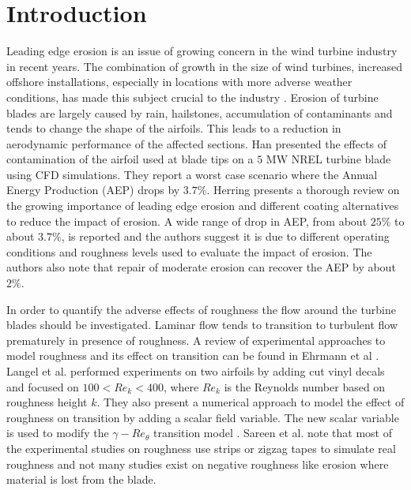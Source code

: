 \section{Introduction}

Leading edge erosion is an issue of growing concern in the wind turbine industry in recent years. The combination of growth in the size of wind turbines, increased offshore installations, especially in locations with more adverse weather conditions, has made this subject crucial to the industry \cite{HERRING2019109382}. Erosion of turbine blades are largely caused by rain, hailstones, accumulation of contaminants and tends to change the shape of the airfoils. This leads to a reduction in aerodynamic performance of the affected sections. Han\citep{han2018effects} presented the effects of contamination of the airfoil used at blade tips on a $5$ MW NREL turbine blade using CFD simulations. They report a worst case scenario where the Annual Energy Production (AEP) drops by $3.7\%$. Herring\cite{HERRING2019109382} presents a thorough review on the growing importance of leading edge erosion and different coating alternatives to reduce the impact of erosion. A wide range of drop in AEP, from about $25\%$ to about $3.7\%$, is reported and the authors suggest it is due to different operating conditions and roughness levels used to evaluate the impact of erosion. The authors also note that repair of moderate erosion can recover the AEP by about $2\%$. 


In order to quantify the adverse effects of roughness the flow around the turbine blades should be investigated. Laminar flow tends to transition to turbulent flow prematurely in presence of roughness. A review of experimental approaches to model roughness and its effect on transition can be found in Ehrmann et al \cite{ehrmann2017effect}. Langel et al. \cite{langel2017rans} performed experiments on two airfoils by adding cut vinyl decals and focused on $100 < Re_k < 400$, where $Re_k$ is the Reynolds number based on roughness height $k$. They also present a numerical approach to model the effect of roughness on transition by adding a scalar field variable. The new scalar variable is used to modify the $\gamma-Re_{\theta}$  transition model \cite{menter2006transition}. Sareen et al. \cite{sareen2014effects} note that most of the experimental studies on roughness use strips or zigzag tapes to simulate real roughness and not many studies exist on negative roughness like erosion where material is lost from the blade. 


